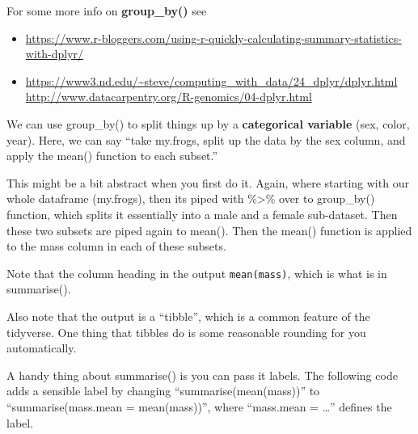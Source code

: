 \documentclass[]{book}
\newenvironment{Shaded}{\begin{snugshade}}{\end{snugshade}}
\newcommand{\KeywordTok}[1]{\textcolor[rgb]{0.13,0.29,0.53}{\textbf{#1}}}
\newcommand{\DataTypeTok}[1]{\textcolor[rgb]{0.13,0.29,0.53}{#1}}
\newcommand{\StringTok}[1]{\textcolor[rgb]{0.31,0.60,0.02}{#1}}
\newcommand{\CommentTok}[1]{\textcolor[rgb]{0.56,0.35,0.01}{\textit{#1}}}
\newcommand{\OperatorTok}[1]{\textcolor[rgb]{0.81,0.36,0.00}{\textbf{#1}}}
\newcommand{\NormalTok}[1]{#1}
\providecommand{\tightlist}{%
  \setlength{\itemsep}{0pt}\setlength{\parskip}{0pt}}
\theoremstyle{definition}
\theoremstyle{definition}
\theoremstyle{definition}
\theoremstyle{remark}
\begin{document}
For some more info on \textbf{group\_by()} see

\begin{itemize}
\tightlist
\item
  \url{https://www.r-bloggers.com/using-r-quickly-calculating-summary-statistics-with-dplyr/}
\item
  \url{https://www3.nd.edu/~steve/computing_with_data/24_dplyr/dplyr.html}
  \url{http://www.datacarpentry.org/R-genomics/04-dplyr.html}
\end{itemize}

We can use group\_by() to split things up by a \textbf{categorical
variable} (sex, color, year). Here, we can say ``take my.frogs, split up
the data by the sex column, and apply the mean() function to each
subset.''

\begin{Shaded}
\end{Shaded}

This might be a bit abstract when you first do it. Again, where starting
with our whole dataframe (my.frogs), then its piped with
\%\textgreater{}\% over to group\_by() function, which splits it
essentially into a male and a female sub-dataset. Then these two subsets
are piped again to mean(). Then the mean() function is applied to the
mass column in each of these subsets.

Note that the column heading in the output \texttt{mean(mass)}, which is
what is in summarise().

Also note that the output is a ``tibble'', which is a common feature of
the tidyverse. One thing that tibbles do is some reasonable rounding for
you automatically.

A handy thing about summarise() is you can pass it labels. The following
code adds a sensible label by changing ``summarise(mean(mass))'' to
``summarise(mass.mean = mean(mass))'', where ``mass.mean = \ldots{}''
defines the label.

\begin{Shaded}
\end{Shaded}
\end{document}
